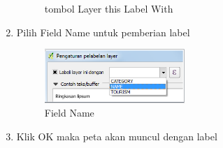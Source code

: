 \begin{enumerate}
\begin{figure}[ht]
    \caption{tombol Layer this Label With}
    \label{laylabel}
    \end{figure}
\item
Pilih Field Name untuk pemberian label
\begin{figure}[ht]
    \centerline{\includegraphics[width=0.5\textwidth]{figures/name}}
    \caption{Field Name}
    \label{name}
    \end{figure}
\item
Klik OK maka peta akan muncul dengan label
\end{enumerate}

